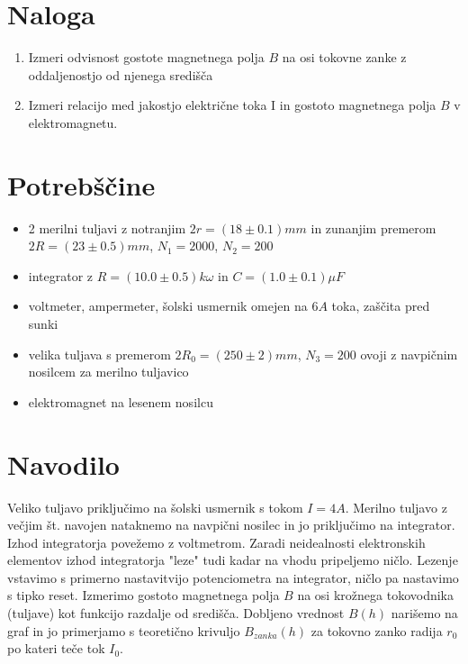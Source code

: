 \documentclass[12pt]{report}
\begin{document}
\chapter*{Naloga}

\begin{enumerate}
  \item Izmeri odvisnost gostote magnetnega polja $B$ na osi tokovne zanke z oddaljenostjo od njenega središča
  \item Izmeri relacijo med jakostjo električne toka I in gostoto magnetnega polja $B$ v elektromagnetu. 
\end{enumerate}

\begingroup
\let\clearpage\relax

\chapter*{Potrebščine}
\begin{itemize}
  \item 2 merilni tuljavi z notranjim $2r = (18 \pm 0.1)mm$ in zunanjim premerom $2R = (23 \pm 0.5)mm$, $N_1 = 2000$, $N_2 = 200$
  \item integrator z $R= (10.0 \pm 0.5)k\omega$ in $C = (1.0 \pm 0.1)\mu F$
  \item voltmeter, ampermeter, šolski usmernik omejen na $6A$ toka, zaščita pred sunki 
  \item velika tuljava s premerom $2R_0 = (250 \pm 2) mm$, $N_3 = 200$ ovoji z navpičnim nosilcem za merilno tuljavico
  \item elektromagnet na lesenem nosilcu
\end{itemize}

\chapter*{Navodilo}
Veliko tuljavo priključimo na šolski usmernik s tokom $ I = 4A$. Merilno tuljavo z večjim št. navojen nataknemo na navpični nosilec in jo priključimo na integrator. Izhod integratorja povežemo z voltmetrom. Zaradi neidealnosti elektronskih elementov izhod integratorja "leze"  tudi kadar na vhodu pripeljemo ničlo. Lezenje vstavimo s primerno nastavitvijo potenciometra na integrator, ničlo pa nastavimo s tipko reset. Izmerimo gostoto magnetnega polja $B$ na osi krožnega tokovodnika (tuljave) kot funkcijo razdalje od središča. Dobljeno vrednost $B(h)$ narišemo na graf in jo primerjamo s teoretično krivuljo $B_{zanka}(h)$ za tokovno zanko radija $r_0$ po kateri teče tok $I_0$. 
\end{document}
